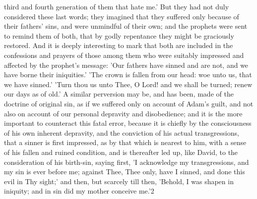 \documentclass[
]{book}
\begin{document}
third and fourth generation of them that hate me.' But they had not duly considered these last words; they imagined that they suffered only because of their fathers' sins, and were unmindful of their own; and the prophets were sent to remind them of both, that by godly repentance they might be graciously restored. And it is deeply interesting to mark that both are included in the confessions and prayers of those among them who were suitably impressed and affected by the prophet's message: 'Our fathers have sinned and are not, and we have borne their iniquities.' 'The crown is fallen from our head: woe unto us, that we have sinned.' 'Turn thou us unto Thee, O Lord! and we shall be turned; renew our days as of old.' A similar perversion may be, and has been, made of the doctrine of original sin, as if we suffered only on account of Adam's guilt, and not also on account of our personal depravity and disobedience; and it is the more important to counteract this fatal error, because it is chiefly by the consciousness of his own inherent depravity, and the conviction of his actual transgressions, that a sinner is first impressed, as by that which is nearest to him, with a sense of his fallen and ruined condition, and is thereafter led up, like David, to the consideration of his birth-sin, saying first, 'I acknowledge my transgressions, and my sin is ever before me; against Thee, Thee only, have I sinned, and done this evil in Thy sight;' and then, but scarcely till then, 'Behold, I was shapen in iniquity; and in sin did my mother conceive me.'2
\end{document}
